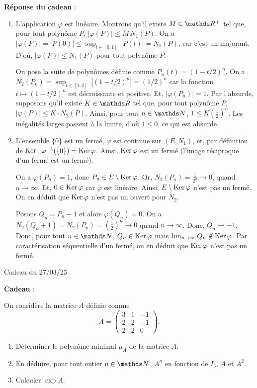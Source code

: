 \documentclass[a4paper]{article}
\begin{document}
	\bigskip\bigskip
	\textbf{Réponse du cadeau} :\\
	\begin{enumerate}
		\item L'application $\varphi$ est linéaire. Montrons qu'il existe $M \in \R^+$ tel que, pour tout polynôme $P$, $|\varphi(P)| \le M\, N_1(P)$.
			On a $|\varphi(P)| = |P(0)| \le \sup_{t \in [0,1]}\:|P(t)| = N_1(P)$, car c'est un majorant. D'où, $|\varphi(P)| \le N_1(P)$ pour tout polynôme $P$.

			On pose la suite de polynômes définie comme $P_n(t) = (1 - t / 2)^n$.
			On a $N_2(P_n) = \sup_{t \in [1,2]}\: |(1-t/2)^n| = (1/2)^n$ car la fonction $t \mapsto (1 - t / 2)^n$ est décroissante et positive.
			Et, $|\varphi(P_n)| = 1$.
			Par l'absurde, supposons qu'il existe $K \in \R$ tel que, pour tout polynôme $P$, $|\varphi(P)| \le K \cdot N_2(P)$.
			Ainsi, pour tout $n \in \N$, $1 \le K \left( \frac{1}{2} \right)^n$. Les inégalités larges passent à la limite, d'où $1 \le 0$, ce qui est absurde.
		\item L'ensemble $\{0\}$ est un fermé, $\varphi$ est continue sur $(E, N_1)$, et, par définition de $\operatorname{Ker}$, $\varphi^{-1}(\{0\}) = \operatorname{Ker} \varphi$.
			Ainsi, $\operatorname{Ker} \varphi$ est un fermé (l'image réciproque d'un fermé est un fermé).

			{\color{gray}
			On a $\varphi(P_n) = 1$, donc $P_n \in E \setminus \operatorname{Ker} \varphi$.
			Or, $N_2(P_n) = \frac{1}{2^n} \to 0$, quand $n \to \infty$.
			Et, $0 \in \operatorname{Ker} \varphi$ car $\varphi$ est linéaire.
			Ainsi, $E \setminus \operatorname{Ker} \varphi$ n'est pas un fermé.
			On en déduit que $\operatorname{Ker} \varphi$ n'est pas un ouvert pour $N_2$. }

			Posons $Q_n = P_n - 1$ et alors $\varphi(Q_n) = 0$.
			On a $N_2(Q_n + 1) = N_2(P_n) = \left( \frac{1}{2} \right)^n \to 0$ quand $n\to \infty$.
			Donc, $Q_n \to -1$.
			Donc, pour tout $n \in \N$, $Q_n \in \operatorname{Ker} \varphi$ mais $\lim_{n\to \infty} Q_n \not\in \operatorname{Ker} \varphi$.
			Par caractérisation séquentielle d'un fermé, on en déduit que $\operatorname{Ker} \varphi$ n'est pas un fermé.
	\end{enumerate}

	\clearpage
	\centerline{\LARGE Cadeau du 27/03/23}

	\bigskip
	\bigskip
	\bigskip
	\textbf{Cadeau} :\\
	\begin{slshape}
		On considère la matrice $A$ définie comme \[
			A = \begin{pmatrix}
				3 & 1 & -1\\
				2 & 2 & -1\\
				2 & 2 & 0
			\end{pmatrix}
		.\]
		\begin{enumerate}
			\item Déterminer le polynôme minimal $\mu_A$ de la matrice $A$.
			\item En déduire, pour tout entier $n \in \N$, $A^n$ en fonction de $I_3$, $A$ et $A^2$.
			\item Calculer $\exp A$.
		\end{enumerate}
	\end{slshape}
\end{document}
